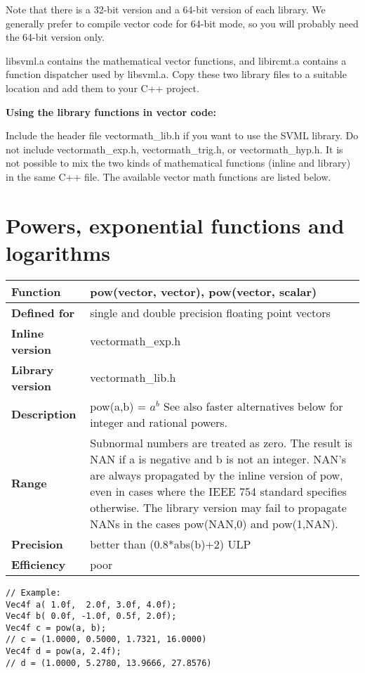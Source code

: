 \documentclass[vcl_manual.tex]{subfiles}
\begin{document}
Note that there is a 32-bit version and a 64-bit version of each library. We generally prefer to compile vector code for 64-bit mode, so you will probably need the 64-bit version only. 

libsvml.a contains the mathematical vector functions, and libircmt.a contains a function dispatcher used by libsvml.a. Copy these two library files to a suitable location and add them to your C++ project.


\textbf{Using the library functions in vector code:}

Include the header file vectormath\_lib.h if you want to use the SVML library. Do not include vectormath\_exp.h, vectormath\_trig.h, or vectormath\_hyp.h. 
It is not possible to mix the two kinds of mathematical functions (inline and library) in the same C++ file. The available vector math functions are listed below.


\section{Powers, exponential functions and logarithms}\label{ExpLogFunctions}

\begin{tabular}{|p{30mm}|p{120mm}|}
\hline
\bfseries Function & pow(vector, vector), pow(vector, scalar) \\ \hline
\bfseries Defined for & single and double precision floating point vectors \\ \hline
\bfseries Inline version & vectormath\_exp.h \\ \hline
\bfseries Library version & vectormath\_lib.h \\ \hline
\bfseries Description & pow(a,b) = $a^b$ \newline 
See also faster alternatives below for integer and rational powers. \\ \hline
\bfseries Range & Subnormal numbers are treated as zero. The result is NAN if a is negative and b is not an integer. NAN's are always propagated by the inline version of pow, even in cases where the IEEE 754 standard specifies otherwise. The library version may fail to propagate NANs in the cases pow(NAN,0) and pow(1,NAN). \\ \hline
\bfseries Precision & better than (0.8*abs(b)+2) ULP \\ \hline
\bfseries Efficiency & poor \\ \hline
\end{tabular}
\begin{lstlisting}[frame=none]
// Example:
Vec4f a( 1.0f,  2.0f, 3.0f, 4.0f);
Vec4f b( 0.0f, -1.0f, 0.5f, 2.0f);
Vec4f c = pow(a, b);
// c = (1.0000, 0.5000, 1.7321, 16.0000)
Vec4f d = pow(a, 2.4f);
// d = (1.0000, 5.2780, 13.9666, 27.8576)
\end{lstlisting}
\end{document}
